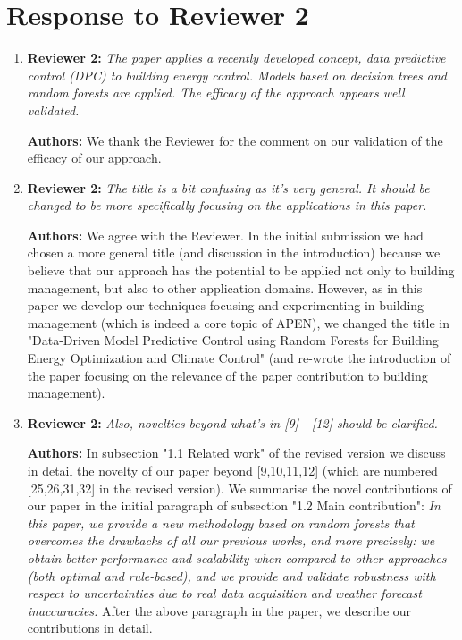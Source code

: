 \documentclass{article}
\begin{document}
\section{Response to Reviewer 2}



\begin{enumerate}

\item \textbf{Reviewer 2:} \textit{The paper applies a recently developed concept, data predictive control (DPC) to building energy control. Models based on decision trees and random forests are applied. The efficacy of the approach appears well validated.}



\textbf{Authors:} We thank the Reviewer for the comment on our validation of the efficacy of our approach.



\item \textbf{Reviewer 2:} \textit{The title is a bit confusing as it's very general. It should be changed to be more specifically focusing on the applications in this paper.}



\textbf{Authors:} We agree with the Reviewer. In the initial submission we had chosen a more general title (and discussion in the introduction) because we believe that our approach has the potential to be applied not only to building management, but also to other application domains. However, as in this paper we develop our techniques focusing and experimenting in building management (which is indeed a core topic of APEN), we changed the title in "Data-Driven Model Predictive Control using Random Forests for Building Energy Optimization and Climate Control" (and re-wrote the introduction of the paper focusing on the relevance of the paper contribution to building management). 



\item \textbf{Reviewer 2:} \textit{Also, novelties beyond what's in [9] - [12] should be clarified.}



\textbf{Authors:} In subsection "1.1 Related work" of the revised version we discuss in detail the novelty of our paper beyond [9,10,11,12] (which are numbered [25,26,31,32] in the revised version). We summarise the novel contributions of our paper in the initial paragraph of subsection "1.2 Main contribution":
\textit{In this paper, we provide a new methodology based on random forests that overcomes the drawbacks of all our previous works, and more precisely: we obtain better performance and scalability when compared to other approaches (both optimal and rule-based), and we provide and validate robustness with respect to uncertainties due to real data acquisition and weather forecast inaccuracies.}
After the above paragraph in the paper, we describe our contributions in detail.




\end{enumerate}
\end{document}
